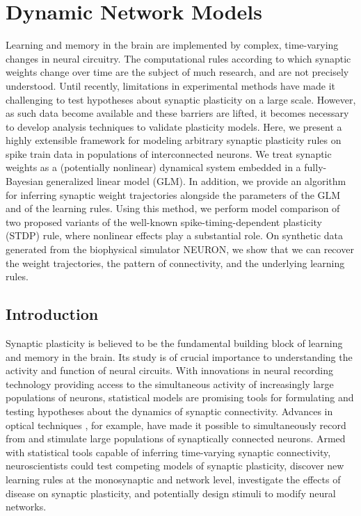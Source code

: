 
\chapter{Dynamic Network Models}

Learning and memory in the brain are implemented by complex,
time-varying changes in neural circuitry. The computational rules
according to which synaptic weights change over time are the subject
of much research, and are not precisely understood. Until recently,
limitations in experimental methods have made it challenging to test
hypotheses about synaptic plasticity on a large scale.  However, as
such data become available and these barriers are lifted, it becomes
necessary to develop analysis techniques to validate plasticity
models.  Here, we present a highly extensible framework for modeling
arbitrary synaptic plasticity rules on spike train data in populations
of interconnected neurons. We treat synaptic weights as a (potentially
nonlinear) dynamical system embedded in a fully-Bayesian generalized
linear model (GLM). In addition, we provide an algorithm for inferring
synaptic weight trajectories alongside the parameters of the GLM and
of the learning rules. Using this method, we perform model comparison
of two proposed variants of the well-known spike-timing-dependent
plasticity (STDP) rule, where nonlinear effects play a substantial
role. On synthetic data generated from the biophysical simulator
NEURON, we show that we can recover the weight trajectories, the
pattern of connectivity, and the underlying learning rules.


\section{Introduction}
Synaptic plasticity is believed to be the fundamental building block
of learning and memory in the brain. Its study is of crucial
importance to understanding the activity and function of neural
circuits. With innovations in neural recording technology providing
access to the simultaneous activity of increasingly large populations
of neurons, statistical models are promising tools for formulating and
testing hypotheses about the dynamics of synaptic
connectivity. Advances in optical techniques \cite{Packer-2012,
  Hochbaum-2014}, for example, have made it possible to simultaneously
record from and stimulate large populations of synaptically connected
neurons. Armed with statistical tools capable of inferring
time-varying synaptic connectivity, neuroscientists could test
competing models of synaptic plasticity, discover new learning rules
at the monosynaptic and network level, investigate the effects of
disease on synaptic plasticity, and potentially design stimuli to
modify neural networks.

